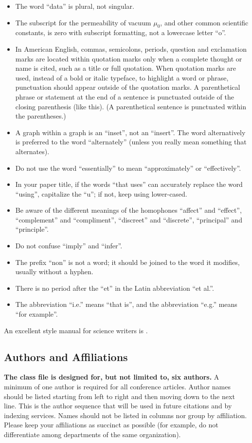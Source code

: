         \begin{itemize}
            \item The word ``data'' is plural, not singular.
            \item The subscript for the permeability of vacuum $\mu_{0}$, and other common scientific constants, is zero with subscript formatting, not a lowercase letter ``o''.
            \item In American English, commas, semicolons, periods, question and exclamation marks are located within quotation marks only when a complete thought or name is cited, such as a title or full quotation.
            When quotation marks are used, instead of a bold or italic typeface, to highlight a word or phrase, punctuation should appear outside of the quotation marks.
            A parenthetical phrase or statement at the end of a sentence is punctuated outside of the closing parenthesis (like this).
            (A parenthetical sentence is punctuated within the parentheses.)
            \item A graph within a graph is an ``inset'', not an ``insert''.
            The word alternatively is preferred to the word ``alternately'' (unless you really mean something that alternates).
            \item Do not use the word ``essentially'' to mean ``approximately'' or ``effectively''.
            \item In your paper title, if the words ``that uses'' can accurately replace the word ``using'', capitalize the ``u''; if not, keep using lower-cased.
            \item Be aware of the different meanings of the homophones ``affect'' and ``effect'', ``complement'' and ``compliment'', ``discreet'' and ``discrete'', ``principal'' and ``principle''.
            \item Do not confuse ``imply'' and ``infer''.
            \item The prefix ``non'' is not a word; it should be joined to the word it modifies, usually without a hyphen.
            \item There is no period after the ``et'' in the Latin abbreviation ``et al.''.
            \item The abbreviation ``i.e.'' means ``that is'', and the abbreviation ``e.g.'' means ``for example''.
        \end{itemize}
        An excellent style manual for science writers is \cite{b7}.

    \subsection{Authors and Affiliations}
        \textbf{The class file is designed for, but not limited to, six authors.}
        A minimum of one author is required for all conference articles.
        Author names should be listed starting from left to right and then moving down to the next line.
        This is the author sequence that will be used in future citations and by indexing services.
        Names should not be listed in columns nor group by affiliation.
        Please keep your affiliations as succinct as possible (for example, do not differentiate among departments of the same organization).

